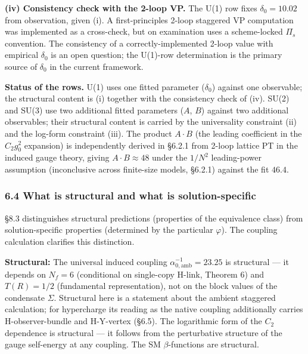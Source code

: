 \documentclass[
]{article}
\begin{document}
\textbf{(iv) Consistency check with the 2-loop VP.} The U(1) row fixes
\(\delta_0 = 10.02\) from observation, given (i). A first-principles
2-loop staggered VP computation was implemented as a cross-check, but on
examination uses a scheme-locked \(\Pi_s\) convention. The consistency
of a correctly-implemented 2-loop value with empirical \(\delta_0\) is
an open question; the U(1)-row determination is the primary source of
\(\delta_0\) in the current framework.

\textbf{Status of the rows.} U(1) uses one fitted parameter
(\(\delta_0\)) against one observable; the structural content is (i)
together with the consistency check of (iv). SU(2) and SU(3) use two
additional fitted parameters (\(A\), \(B\)) against two additional
observables; their structural content is carried by the universality
constraint (ii) and the log-form constraint (iii). The product
\(A \cdot B\) (the leading coefficient in the \(C_2 g_0^2\) expansion)
is independently derived in §6.2.1 from 2-loop lattice PT in the induced
gauge theory, giving \(A \cdot B \approx 48\) under the \(1/N^2\)
leading-power assumption (inconclusive across finite-size models,
§6.2.1) against the fit \(46.4\).

\hypertarget{what-is-structural-and-what-is-solution-specific}{%
\subsubsection{6.4 What is structural and what is
solution-specific}\label{what-is-structural-and-what-is-solution-specific}}

§8.3 distinguishes structural predictions (properties of the equivalence
class) from solution-specific properties (determined by the particular
\(\varphi\)). The coupling calculation clarifies this distinction.

\textbf{Structural:} The universal induced coupling
\(\alpha^{-1}_{0,\mathrm{amb}} = 23.25\) is structural --- it depends on
\(N_f=6\) (conditional on single-copy H-link, Theorem 6) and
\(T(R) = 1/2\) (fundamental representation), not on the block values of
the condensate \(\Sigma\). Structural here is a statement about the
ambient staggered calculation; for hypercharge its reading as the native
coupling additionally carries H-observer-bundle and H-Y-vertex (§6.5).
The logarithmic form of the \(C_2\) dependence is structural --- it
follows from the perturbative structure of the gauge self-energy at any
coupling. The SM \(\beta\)-functions are structural.
\end{document}
